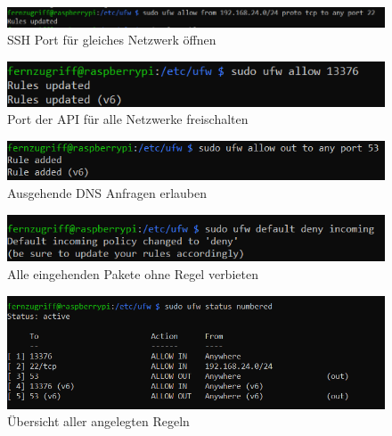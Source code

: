 \documentclass[a4paper, 11pt]{scrartcl}
\begin{document}
\begin{figure}[H]
    \begin{center}
        \includegraphics[scale=0.7]{Bilder/allow_ssh_from_network.png}
        \caption{SSH Port für gleiches Netzwerk öffnen}\label{pic:ssh_port_allow}
    \end{center}
\end{figure}

\begin{figure}[H]
    \begin{center}
        \includegraphics[scale=0.7]{Bilder/ufw_allow_api.png}
        \caption{Port der API für alle Netzwerke freischalten}\label{pic:api_port_allow}
    \end{center}
\end{figure}

\begin{figure}[H]
    \begin{center}
        \includegraphics[scale=0.7]{Bilder/ufw_allow_out_dns.png}
        \caption{Ausgehende DNS Anfragen erlauben}\label{pic:dns_allow_out}
    \end{center}
\end{figure}

\begin{figure}[H]
    \begin{center}
        \includegraphics[scale=0.7]{Bilder/ufw_deny_all_incoming.png}
        \caption{Alle eingehenden Pakete ohne Regel verbieten}\label{pic:firewall_deny_default}
    \end{center}
\end{figure}

\begin{figure}[H]
    \begin{center}
        \includegraphics[scale=0.7]{Bilder/ufw_status_all_rules.png}
        \caption{Übersicht aller angelegten Regeln}\label{pic:firewall_status}
    \end{center}
\end{figure}
\end{document}
